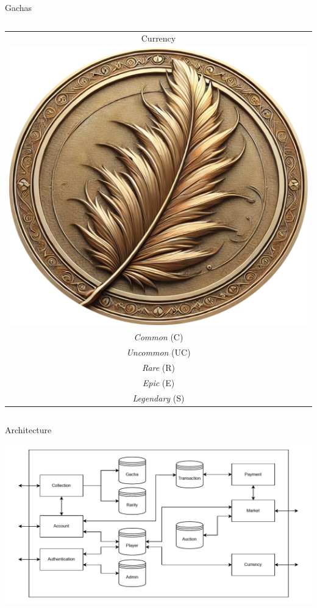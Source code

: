 \documentclass[12pt,aspectratio=169,notheorems]{beamer}
\begin{document}
\begin{frame}{Gachas}
\begin{columns}
        \begin{column}{.15\textwidth}
            \begin{tabular}{c}
                Currency \\[0.5ex]
                \includegraphics[width=.90\textwidth]{Currency .png} \\[0.5ex]
                {\tiny \emph{Common} (C)} \\
                {\tiny \emph{Uncommon} (UC)} \\
                {\tiny \emph{Rare} (R)} \\
                {\tiny \emph{Epic} (E)} \\
                {\tiny \emph{Legendary} (S)}
            \end{tabular}
        \end{column}
    \end{columns}
\end{frame}

\begin{frame}{Architecture}
    \begin{center}
        \includegraphics[scale=.65]{architecture-v1.png}
    \end{center}
\end{frame}
\end{document}
